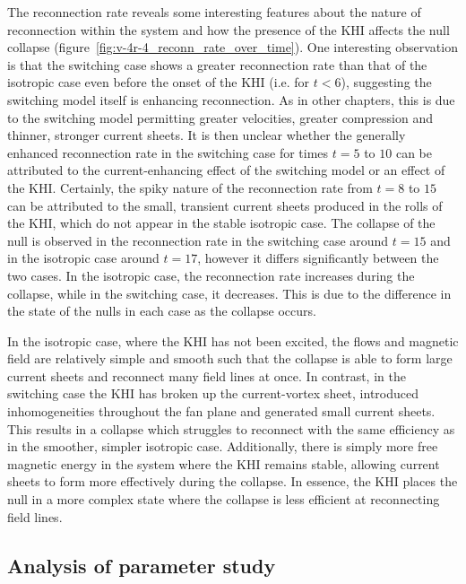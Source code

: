 The reconnection rate reveals some interesting features about the nature of reconnection within the system and how the presence of the KHI affects the null collapse (figure~\ref{fig:v-4r-4_reconn_rate_over_time}). One interesting observation is that the switching case shows a greater reconnection rate than that of the isotropic case even before the onset of the KHI (i.e. for $t < 6$), suggesting the switching model itself is enhancing reconnection. As in other chapters, this is due to the switching model permitting greater velocities, greater compression and thinner, stronger current sheets. It is then unclear whether the generally enhanced reconnection rate in the switching case for times $t=5$ to $10$ can be attributed to the current-enhancing effect of the switching model or an effect of the KHI. Certainly, the spiky nature of the reconnection rate from $t=8$ to $15$ can be attributed to the small, transient current sheets produced in the rolls of the KHI, which do not appear in the stable isotropic case. The collapse of the null is observed in the reconnection rate in the switching case around $t=15$ and in the isotropic case around $t=17$, however it differs significantly between the two cases. In the isotropic case, the reconnection rate increases during the collapse, while in the switching case, it decreases. This is due to the difference in the state of the nulls in each case as the collapse occurs.

In the isotropic case, where the KHI has not been excited, the flows and magnetic field are relatively simple and smooth such that the collapse is able to form large current sheets and reconnect many field lines at once. In contrast, in the switching case the KHI has broken up the current-vortex sheet, introduced inhomogeneities throughout the fan plane and generated small current sheets. This results in a collapse which struggles to reconnect with the same efficiency as in the smoother, simpler isotropic case. Additionally, there is simply more free magnetic energy in the system where the KHI remains stable, allowing current sheets to form more effectively during the collapse. In essence, the KHI places the null in a more complex state where the collapse is less efficient at reconnecting field lines.

\subsection{Analysis of parameter study}


